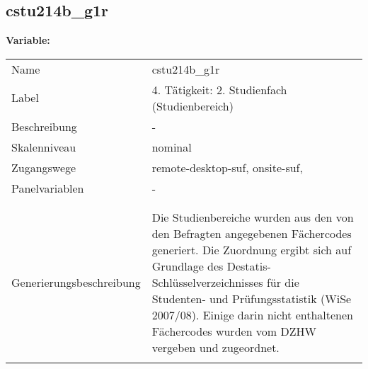 	
	
	\subsection{cstu214b\_g1r}
	\label{subSection:cstu214b_g1r}

	\noindent\textbf{Variable:}\\
		\begin{tabular}{lL{11.3cm}}
			\label{tableVariable:cstu214b_g1r}
			Name & cstu214b\_g1r \\
			Label & 4. Tätigkeit: 2. Studienfach (Studienbereich) \\
			Beschreibung & - \\
			Skalenniveau & nominal \\
			Zugangswege &
				remote-desktop-suf,
				onsite-suf,
 \\
			Panelvariablen & -
			 \\
			 \\
 \\
					Generierungsbeschreibung & Die Studienbereiche wurden aus den von den Befragten angegebenen Fächercodes generiert. Die Zuordnung ergibt sich auf Grundlage des Destatis-Schlüsselverzeichnisses für die Studenten- und Prüfungsstatistik (WiSe 2007/08). Einige darin nicht enthaltenen Fächercodes wurden vom DZHW vergeben und zugeordnet. 
				 \\	
			 \\
		\end{tabular}






